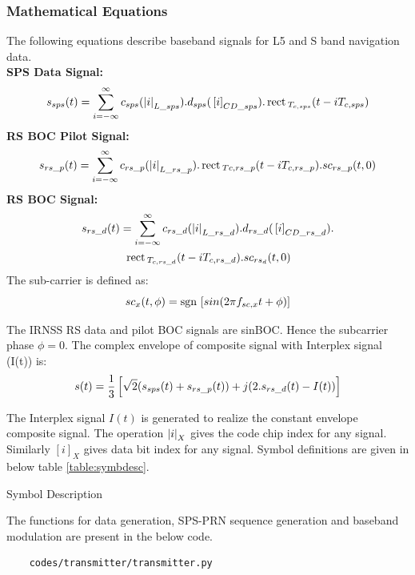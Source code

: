 \subsubsection{Mathematical Equations}
The following equations describe baseband signals for L5 and S band navigation data.
\\
\textbf{SPS Data Signal:}
\begin{equation}
	s_{sps}(t) = \sum_{i=-\infty}^{\infty} c_{sps}(\left\vert i\right\vert_{L\_sps}) . d_{sps}({}\left[i\right]_{CD\_sps}) . \,\text{rect}\,_{T_{c,sps}}(t-iT_{c,sps})
\end{equation}
\textbf{RS BOC Pilot Signal:}
\begin{equation}
	s_{rs\_p}(t) = \sum_{i=-\infty}^{\infty} c_{rs\_p}(\left\vert i\right\vert_{L\_rs\_p}) . \,\text{rect}\,_{Tc,rs\_p}(t-iT_{c,rs\_p}). sc_{rs\_p}(t,0)
\end{equation}
\textbf{RS BOC Signal:}
\begin{multline}
	s_{rs\_d}(t) = \sum_{i=-\infty}^{\infty} c_{rs\_d}(\left\vert i\right\vert_{L\_rs\_d}) . d_{rs\_d}({}\left[i\right]_{CD\_rs\_d}).  \\ 
	                       \,\text{rect}\,_{T_{c,rs\_d}}(t-iT_{c,rs\_d}). sc_{rs_d}(t,0)
\end{multline}
The sub-carrier is defined as:
\begin{equation}
	sc_x(t,\phi) = \mathop{\mathrm{sgn}}{}\left[sin(2 \pi f_{sc,x}t + \phi)\right]
\end{equation}

\noindent The IRNSS RS data and pilot BOC signals are sinBOC. Hence the subcarrier phase $\phi=0$.
The complex envelope of composite signal with Interplex signal (I(t)) is:
\begin{equation}
s(t) = \dfrac{1}{3} {}\left[\sqrt{2} (s_{sps}(t) + s_{rs\_p}(t)) + j(2. s_{rs\_d}(t) - I(t))\right] 
\end{equation}

\noindent The Interplex signal $I(t)$ is generated to realize the constant envelope composite signal. The operation $\left\vert i\right\vert_X$ gives the code chip index for any signal. Similarly $[i]_X$ gives data bit index for any signal.
Symbol definitions are given in below table \ref{table:symbdesc}.

\begin{table}[h]

\vspace{3mm}
\caption{Symbol Description}
\label{table:symbdesc}
\end{table}

The functions for data generation, SPS-PRN sequence generation and baseband modulation are present in the below code.
\begin{lstlisting}
    codes/transmitter/transmitter.py
\end{lstlisting}

